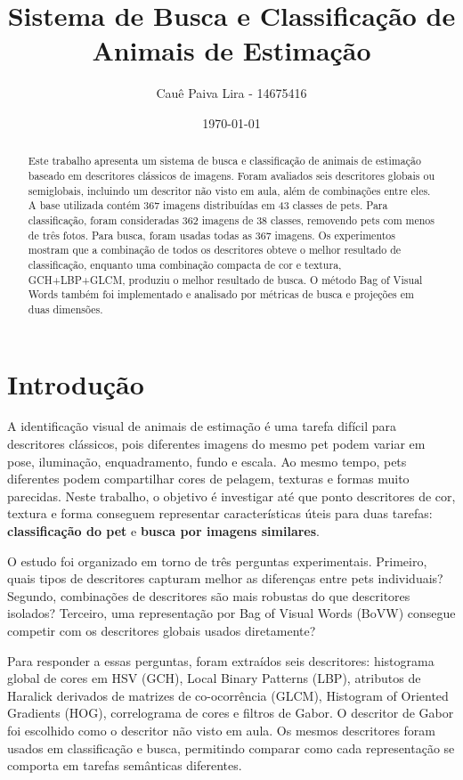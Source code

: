 \documentclass[12pt,a4paper]{article}
\title{Sistema de Busca e Classificação de Animais de Estimação}
\author{Cauê Paiva Lira - 14675416}
\date{\today}
\begin{document}
\maketitle

\begin{abstract}
Este trabalho apresenta um sistema de busca e classificação de animais de estimação baseado em descritores clássicos de imagens. Foram avaliados seis descritores globais ou semiglobais, incluindo um descritor não visto em aula, além de combinações entre eles. A base utilizada contém 367 imagens distribuídas em 43 classes de pets. Para classificação, foram consideradas 362 imagens de 38 classes, removendo pets com menos de três fotos. Para busca, foram usadas todas as 367 imagens. Os experimentos mostram que a combinação de todos os descritores obteve o melhor resultado de classificação, enquanto uma combinação compacta de cor e textura, GCH+LBP+GLCM, produziu o melhor resultado de busca. O método Bag of Visual Words também foi implementado e analisado por métricas de busca e projeções em duas dimensões.
\end{abstract}

\section{Introdução}

A identificação visual de animais de estimação é uma tarefa difícil para descritores clássicos, pois diferentes imagens do mesmo pet podem variar em pose, iluminação, enquadramento, fundo e escala. Ao mesmo tempo, pets diferentes podem compartilhar cores de pelagem, texturas e formas muito parecidas. Neste trabalho, o objetivo é investigar até que ponto descritores de cor, textura e forma conseguem representar características úteis para duas tarefas: \textbf{classificação do pet} e \textbf{busca por imagens similares}.

O estudo foi organizado em torno de três perguntas experimentais. Primeiro, quais tipos de descritores capturam melhor as diferenças entre pets individuais? Segundo, combinações de descritores são mais robustas do que descritores isolados? Terceiro, uma representação por Bag of Visual Words (BoVW) consegue competir com os descritores globais usados diretamente?

Para responder a essas perguntas, foram extraídos seis descritores: histograma global de cores em HSV (GCH), Local Binary Patterns (LBP), atributos de Haralick derivados de matrizes de co-ocorrência (GLCM), Histogram of Oriented Gradients (HOG), correlograma de cores e filtros de Gabor. O descritor de Gabor foi escolhido como o descritor não visto em aula. Os mesmos descritores foram usados em classificação e busca, permitindo comparar como cada representação se comporta em tarefas semânticas diferentes.
\end{document}

